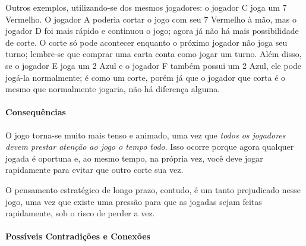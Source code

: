 Outros exemplos, utilizando-se dos mesmos jogadores: o jogador C joga um 7 Vermelho. O jogador A poderia cortar o jogo com seu 7 Vermelho à mão, mas o jogador D foi mais rápido e continuou o jogo; agora já não há mais possibilidade de corte. O corte só pode acontecer enquanto o próximo jogador não joga seu turno; lembre-se que comprar uma carta conta como jogar um turno. Além disso, se o jogador E joga um 2 Azul e o jogador F também possui um 2 Azul, ele pode jogá-la normalmente; é como um corte, porém já que o jogador que corta é o mesmo que normalmente jogaria, não há diferença alguma.

\paragraph{Consequências}

O jogo torna-se muito mais tenso e animado, uma vez que \emph{todos os jogadores devem prestar atenção ao jogo o tempo todo}. Isso ocorre porque agora qualquer jogada é oportuna e, ao mesmo tempo, na própria vez, você deve jogar rapidamente para evitar que outro corte sua vez.

O pensamento estratégico de longo prazo, contudo, é um tanto prejudicado nesse jogo, uma vez que existe uma pressão para que as jogadas sejam feitas rapidamente, sob o risco de perder a vez.

\paragraph{Possíveis Contradições e Conexões}


